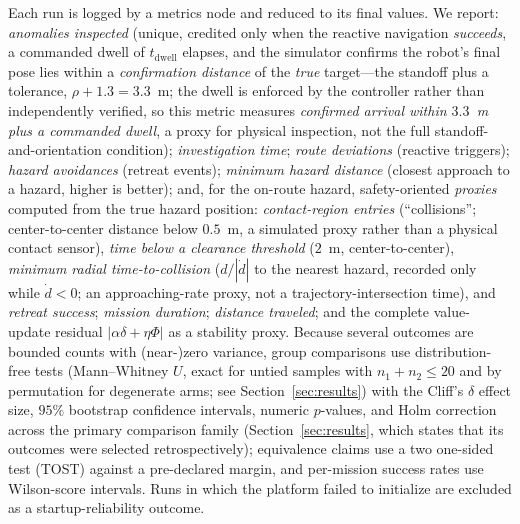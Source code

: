 Each run is logged by a metrics node and reduced to its final values. We report:
\emph{anomalies inspected} (unique, credited only when the reactive navigation
\emph{succeeds}, a commanded dwell of $t_{\text{dwell}}$ elapses, and the simulator
confirms the robot's final pose lies within a \emph{confirmation distance} of the
\emph{true} target---the standoff plus a tolerance, $\rho + 1.3 = 3.3$~m; the dwell
is enforced by the controller rather than independently verified, so this metric
measures \emph{confirmed arrival within $3.3$~m plus a commanded dwell}, a proxy for
physical inspection, not the full standoff-and-orientation condition);
\emph{investigation time}; \emph{route deviations} (reactive triggers);
\emph{hazard avoidances} (retreat events); \emph{minimum hazard distance}
(closest approach to a hazard, higher is better); and, for the on-route hazard,
safety-oriented \emph{proxies} computed from the true hazard position:
\emph{contact-region entries} (``collisions''; center-to-center distance below
$0.5$~m, a simulated proxy rather than a physical contact sensor), \emph{time below
a clearance threshold} ($2$~m, center-to-center), \emph{minimum radial
time-to-collision}
($d/|\dot d|$ to the nearest hazard, recorded only while $\dot d<0$; an
approaching-rate proxy, not a trajectory-intersection time), and \emph{retreat success}; \emph{mission duration};
\emph{distance traveled}; and the complete value-update residual
$|\alpha\delta+\eta\Phi|$ as a stability proxy. Because several outcomes are
bounded counts with (near-)zero variance, group comparisons use distribution-free
tests (Mann--Whitney $U$, exact for untied samples with $n_1+n_2\le20$ and by
permutation for degenerate arms; see Section~\ref{sec:results}) with the Cliff's
$\delta$ effect size, $95\%$ bootstrap confidence intervals, numeric $p$-values,
and Holm correction across the primary comparison family
(Section~\ref{sec:results}, which states that its outcomes were selected
retrospectively); equivalence claims use a two
one-sided test (TOST) against a pre-declared margin, and per-mission success rates
use Wilson-score intervals. Runs in which the platform failed to initialize are
excluded as a startup-reliability outcome.

